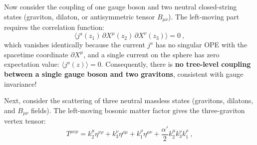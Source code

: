Now consider the coupling of one gauge boson and two neutral closed-string states (graviton, dilaton, or antisymmetric tensor $B_{\mu\nu}$). The left-moving part requires the correlation function:
\begin{equation}
	\langle j^{a}(z_{1})\,\partial X^{\mu}(z_{2})\,\partial X^{\nu}(z_{3})\rangle = 0 \:, \label{12.4.12}
\end{equation}
which vanishes identically because the current $j^{a}$ has no singular OPE with the spacetime coordinate $\partial X^{\mu}$, and a single current on the sphere has zero expectation value: $\langle j^{a}(z)\rangle = 0$. Consequently, there is \textbf{no tree-level coupling between a single gauge boson and two gravitons}, consistent with gauge invariance!

Next, consider the scattering of three neutral massless states (gravitons, dilatons, and $B_{\mu\nu}$ fields). 
The left-moving bosonic matter factor gives the three-graviton vertex tensor:
\begin{equation}
	T^{\mu\nu\rho} = k_{2}^{\mu}\eta^{\nu\rho} + k_{3}^{\nu}\eta^{\rho\mu} + k_{1}^{\rho}\eta^{\mu\nu} + \frac{\alpha'}{2}k_{2}^{\mu}k_{3}^{\nu}k_{1}^{\rho} \:, \label{12.4.11}
\end{equation}
